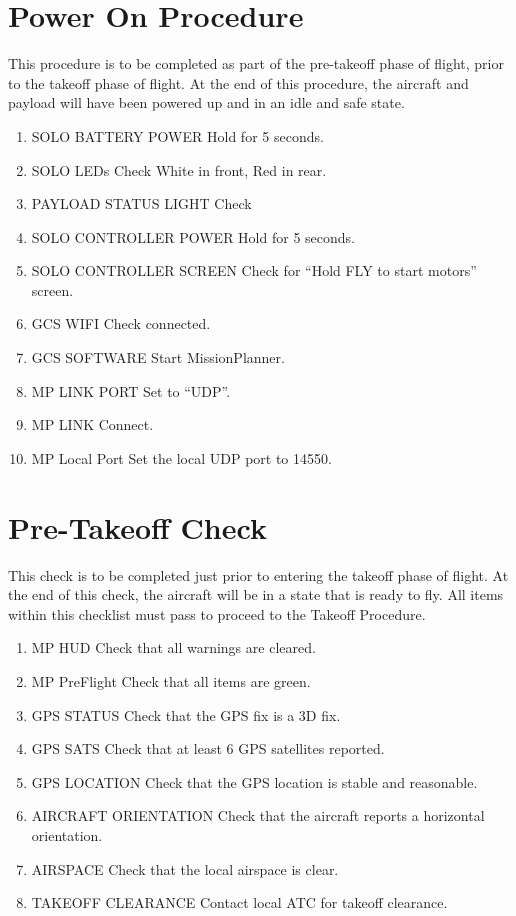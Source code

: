 \documentclass{report}
\begin{document}
	\section{Power On Procedure}
		This procedure is to be completed as part of the pre-takeoff phase of flight, prior to the takeoff phase of flight.  At the end of this procedure, the aircraft and payload will have been powered up and in an idle and safe state.
		\begin{enumerate}
			\item SOLO BATTERY POWER \hrulefill Hold for 5 seconds.
			\item SOLO LEDs \hrulefill Check White in front, Red in rear.
			\item PAYLOAD STATUS LIGHT \hrulefill Check
			\item SOLO CONTROLLER POWER \hrulefill Hold for 5 seconds.
			\item SOLO CONTROLLER SCREEN \hrulefill Check for ``Hold FLY to start motors'' screen.
			\item GCS WIFI \hrulefill Check connected.
			\item GCS SOFTWARE \hrulefill Start MissionPlanner.
			\item MP LINK PORT \hrulefill Set to ``UDP''.
			\item MP LINK \hrulefill Connect.
			\item MP Local Port \hrulefill Set the local UDP port to 14550.
		\end{enumerate}
	\section{Pre-Takeoff Check}
		This check is to be completed just prior to entering the takeoff phase of flight.  At the end of this check, the aircraft will be in a state that is ready to fly.  All items within this checklist must pass to proceed to the Takeoff Procedure.
		\begin{enumerate}
			\item MP HUD \hrulefill Check that all warnings are cleared.
			\item MP PreFlight \hrulefill Check that all items are green.
			\item GPS STATUS \hrulefill Check that the GPS fix is a 3D fix.
			\item GPS SATS \hrulefill Check that at least 6 GPS satellites reported.
			\item GPS LOCATION \hrulefill Check that the GPS location is stable and reasonable.
			\item AIRCRAFT ORIENTATION \hrulefill Check that the aircraft reports a horizontal orientation.
			\item AIRSPACE \hrulefill Check that the local airspace is clear.
			\item TAKEOFF CLEARANCE \hrulefill Contact local ATC for takeoff clearance.
		\end{enumerate}
\end{document}
